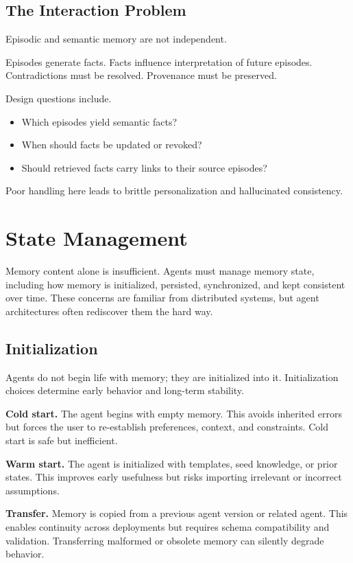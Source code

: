 \subsection{The Interaction Problem}

Episodic and semantic memory are not independent.

Episodes generate facts. Facts influence interpretation of future episodes. Contradictions must be resolved. Provenance must be preserved.

Design questions include.
\begin{itemize}
\item Which episodes yield semantic facts?
\item When should facts be updated or revoked?
\item Should retrieved facts carry links to their source episodes?
\end{itemize}

Poor handling here leads to brittle personalization and hallucinated consistency.
\section{State Management}

Memory content alone is insufficient. Agents must manage memory state, including how memory is initialized, persisted, synchronized, and kept consistent over time. These concerns are familiar from distributed systems, but agent architectures often rediscover them the hard way.

\subsection{Initialization}

Agents do not begin life with memory; they are initialized into it. Initialization choices determine early behavior and long-term stability.

\textbf{Cold start.}
The agent begins with empty memory. This avoids inherited errors but forces the user to re-establish preferences, context, and constraints. Cold start is safe but inefficient.

\textbf{Warm start.}
The agent is initialized with templates, seed knowledge, or prior states. This improves early usefulness but risks importing irrelevant or incorrect assumptions.

\textbf{Transfer.}
Memory is copied from a previous agent version or related agent. This enables continuity across deployments but requires schema compatibility and validation. Transferring malformed or obsolete memory can silently degrade behavior.

